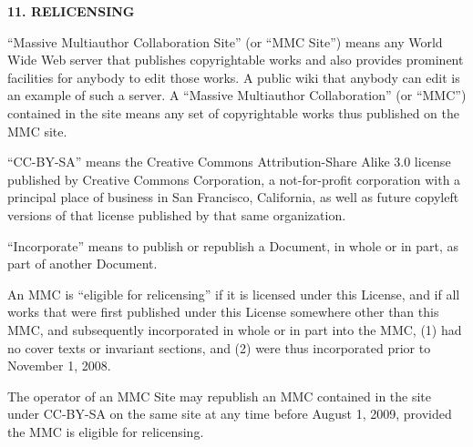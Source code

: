 \documentclass[onecolumn,a4paper]{article}
\numberwithin{equation}{section}
\begin{document}
\begin{center}
{\Large\bf 11. RELICENSING\par}
\end{center}

``Massive Multiauthor Collaboration Site'' (or ``MMC Site'') means any
World Wide Web server that publishes copyrightable works and also
provides prominent facilities for anybody to edit those works.  A
public wiki that anybody can edit is an example of such a server.  A
``Massive Multiauthor Collaboration'' (or ``MMC'') contained in the
site means any set of copyrightable works thus published on the MMC
site.

``CC-BY-SA'' means the Creative Commons Attribution-Share Alike 3.0
license published by Creative Commons Corporation, a not-for-profit
corporation with a principal place of business in San Francisco,
California, as well as future copyleft versions of that license
published by that same organization.

``Incorporate'' means to publish or republish a Document, in whole or
in part, as part of another Document.

An MMC is ``eligible for relicensing'' if it is licensed under this
License, and if all works that were first published under this License
somewhere other than this MMC, and subsequently incorporated in whole
or in part into the MMC, (1) had no cover texts or invariant sections,
and (2) were thus incorporated prior to November 1, 2008.

The operator of an MMC Site may republish an MMC contained in the site
under CC-BY-SA on the same site at any time before August 1, 2009,
provided the MMC is eligible for relicensing.

%
%
\end{document}
